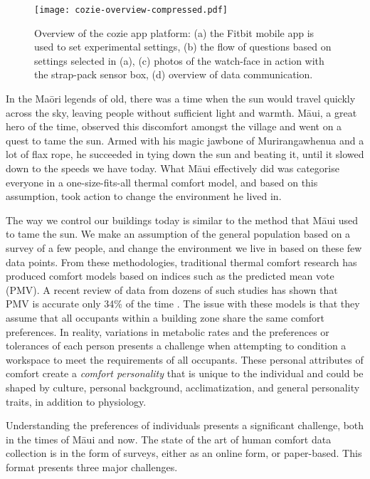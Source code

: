 
\begin{figure}
\begin{center}
\texttt{[image: cozie-overview-compressed.pdf]}
\caption{Overview of the cozie app platform: (a) the Fitbit mobile app is used to set experimental settings, (b) the flow of questions based on settings selected in (a), (c) photos of the watch-face in action with the strap-pack sensor box, (d) overview of data communication.}
\label{fig:homescreen}
\end{center}
\end{figure}

In the Ma\={o}ri legends of old, there was a time when the sun would travel quickly across the sky, leaving people without sufficient light and warmth. M\={a}ui, a great hero of the time, observed this discomfort amongst the village and went on a quest to tame the sun. Armed with his magic jawbone of Murirangawhenua and a lot of flax rope, he succeeded in tying down the sun and beating it, until it slowed down to the speeds we have today. What M\={a}ui effectively did was categorise everyone in a one-size-fits-all thermal comfort model, and based on this assumption, took action to change the environment he lived in. 

The way we control our buildings today is similar to the method that M\={a}ui used to tame the sun. We make an assumption of the general population based on a survey of a few people, and change the environment we live in based on these few data points. From these methodologies, traditional thermal comfort research has produced comfort models based on indices such as the predicted mean vote (PMV). A recent review of data from dozens of such studies has shown that PMV is accurate only 34\% of the time \cite{CHEUNG2019205}. The issue with these models is that they assume that all occupants within a building zone share the same comfort preferences. In reality, variations in metabolic rates and the preferences or tolerances of each person presents a challenge when attempting to condition a workspace to meet the requirements of all occupants. These personal attributes of comfort create a \emph{comfort personality} that is unique to the individual and could be shaped by culture, personal background, acclimatization, and general personality traits, in addition to physiology. 

Understanding the preferences of individuals presents a significant challenge, both in the times of M\={a}ui and now. The state of the art of human comfort data collection is in the form of surveys, either as an online form, or paper-based. This format presents three major challenges.

